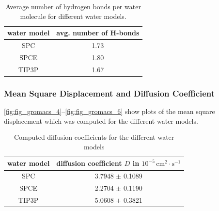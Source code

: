 \documentclass[a4paper,10pt,bibtotoc]{scrartcl}
\begin{document}
\begin{table}[h]
\centering
\caption{Average number of hydrogen bonds per water molecule for different water models.}
\begin{tabular}{@{}cc@{}}
\toprule
water model & avg. number of H-bonds \\ \midrule
SPC         &          1.73                 \\
SPCE        &          1.80               \\
TIP3P       &          1.67                 \\ \bottomrule
\end{tabular}
\label{tab1}
\end{table}

\subsubsection*{Mean Square Displacement and Diffusion Coefficient}
\autoref{fig:fig_gromacs_4}--\autoref{fig:fig_gromacs_6} show plots of the mean square displacement which was computed for the different water models.

\begin{table}[h]
\centering
\caption{Computed diffusion coefficients for the different water models}
\begin{tabular}{@{}cc@{}}
\toprule
water model & diffusion coefficient $D$ in $10^{-5}\,\mathrm{cm}^2\cdot \mathrm{s}^{-1}$ \\ \midrule
SPC         &          3.7948 $\pm$ 0.1089                 \\
SPCE        &          2.2704 $\pm$ 0.1190            \\
TIP3P       &          5.0608 $\pm$       0.3821    \\ \bottomrule
\end{tabular}
\label{tab1}
\end{table}
\end{document}
